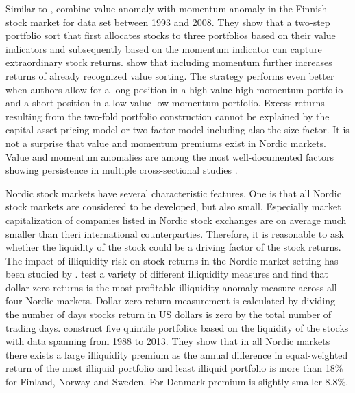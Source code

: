 \documentclass[12pt]{article}
\begin{document}
Similar to \citet{grobys}, \citet{leivo2011} combine value anomaly with momentum anomaly in the Finnish stock market for data set between 1993 and 2008. They show that a two-step portfolio sort that first allocates stocks to three portfolios based on their value indicators and subsequently based on the momentum indicator can capture extraordinary stock returns.\citeauthor{leivo2011} show that including momentum further increases returns of already recognized value sorting. The strategy performs even better when authors allow for a long position in a high value high momentum portfolio and a short position in a low value low momentum portfolio. Excess returns resulting from the two-fold portfolio construction cannot be explained by the capital asset pricing model or two-factor model including also the size factor. It is not a surprise that value and momentum premiums exist in Nordic markets. Value and momentum anomalies are among the most well-documented factors showing persistence in multiple cross-sectional studies \citep[e.g.][]{guetal, Lewellen2015, Drobetz, TOBEK2021100588}. \par

Nordic stock markets have several characteristic features. One is that all Nordic stock markets are considered to be developed, but also small. Especially market capitalization of companies listed in Nordic stock exchanges are on average much smaller than theri international counterparties. Therefore, it is reasonable to ask whether the liquidity of the stock could be a driving factor of the stock returns. The impact of illiquidity risk on stock returns in the Nordic market setting has been studied by \citet{Butt2018}. \citeauthor{Butt2018} test a variety of different illiquidity measures and find that dollar zero returns is the most profitable illiquidity anomaly measure across all four Nordic markets. Dollar zero return measurement is calculated by dividing the number of days stocks return in US dollars is zero by the total number of trading days. \citeauthor{Butt2018} construct five quintile portfolios based on the liquidity of the stocks with data spanning from 1988 to 2013. They show that in all Nordic markets there exists a large illiquidity premium as the annual difference in equal-weighted return of the most illiquid portfolio and least illiquid portfolio is more than 18\% for Finland, Norway and Sweden. For Denmark premium is slightly smaller 8.8\%. \par
\end{document}
